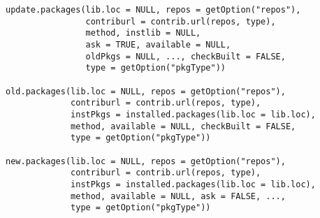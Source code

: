 %
\begin{Usage}
\begin{verbatim}
update.packages(lib.loc = NULL, repos = getOption("repos"),
                contriburl = contrib.url(repos, type),
                method, instlib = NULL,
                ask = TRUE, available = NULL,
                oldPkgs = NULL, ..., checkBuilt = FALSE,
                type = getOption("pkgType"))

old.packages(lib.loc = NULL, repos = getOption("repos"),
             contriburl = contrib.url(repos, type),
             instPkgs = installed.packages(lib.loc = lib.loc),
             method, available = NULL, checkBuilt = FALSE,
             type = getOption("pkgType"))

new.packages(lib.loc = NULL, repos = getOption("repos"),
             contriburl = contrib.url(repos, type),
             instPkgs = installed.packages(lib.loc = lib.loc),
             method, available = NULL, ask = FALSE, ...,
             type = getOption("pkgType"))
\end{verbatim}
\end{Usage}
%
